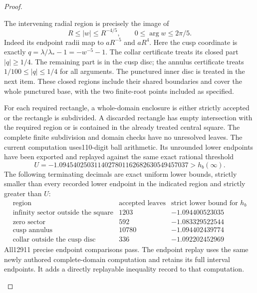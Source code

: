 \begin{proof}
\begin{enumerate}[label=\arabic*.]
The intervening radial region is precisely the image of
\[
 R\le|w|\le R^{-4/5},\qquad 0\le\arg w\le2\pi/5.
\]
Indeed its endpoint radii map to $aR^{-5}$ and $aR^4$.
Here the cusp coordinate is exactly
$q=\lambda/\lambda_*-1=-w^{-5}-1$.
The collar certificate treats its closed part $|q|\ge1/4$.
The remaining part is in the cusp disc; the annulus certificate
treats $1/100\le|q|\le1/4$ for all arguments. The punctured
inner disc is treated in the next item. These closed regions
include their shared boundaries and cover the whole punctured
base, with the two finite-root points included as specified.

For each required rectangle, a whole-domain enclosure is either
strictly accepted or the rectangle is subdivided. A discarded
rectangle has empty intersection with the required region or is
contained in the already treated central square. The complete
finite subdivision and domain checks have no unresolved leaves.
The current computation uses110-digit ball arithmetic. Its
unrounded lower endpoints have been exported and replayed against
the same exact rational threshold
\[
 U=-1.0945402503114027801162682630549457037
       >h_b(\infty).
\]
The following terminating decimals are exact uniform lower
bounds, strictly smaller than every recorded lower endpoint
in the indicated region and strictly greater than $U$:
\[
 \begin{array}{lrr}
 \text{region}&\text{accepted leaves}&\text{strict lower bound for }h_b\\
 \hline
 \text{infinity sector outside the square}&1203&-1.094400523035\\
 \text{zero sector}&592&-1.083329522544\\
 \text{cusp annulus}&10780&-1.094402439774\\
 \text{collar outside the cusp disc}&336&-1.092202452969
 \end{array}
\]
All12911 precise endpoint comparisons pass. The endpoint replay
uses the same newly authored complete-domain computation and
retains its full interval endpoints. It adds a directly
replayable inequality record to that computation.


\end{enumerate}
\end{proof}
